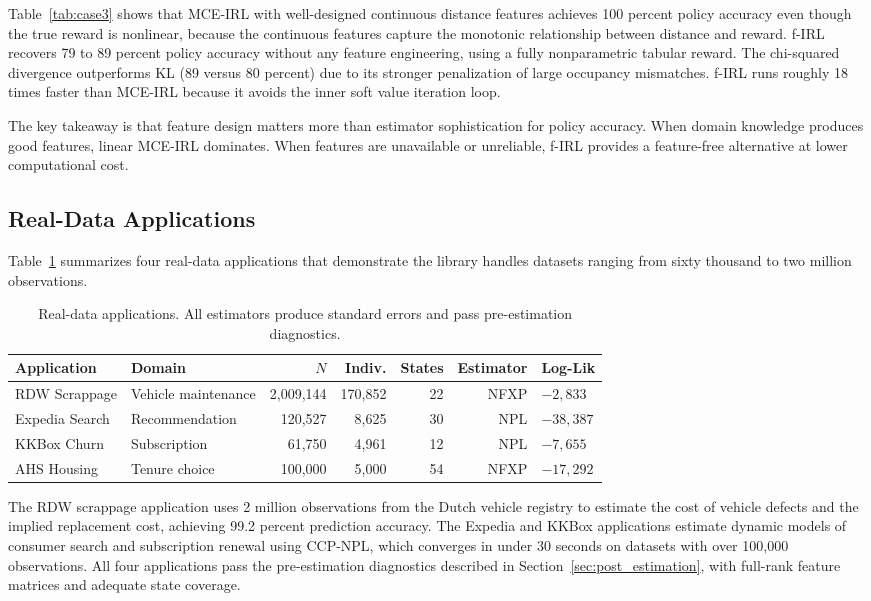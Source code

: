 Table~\ref{tab:case3} shows that MCE-IRL with well-designed continuous distance features achieves 100 percent policy accuracy even though the true reward is nonlinear, because the continuous features capture the monotonic relationship between distance and reward.
f-IRL recovers 79 to 89 percent policy accuracy without any feature engineering, using a fully nonparametric tabular reward.
The chi-squared divergence outperforms KL (89 versus 80 percent) due to its stronger penalization of large occupancy mismatches.
f-IRL runs roughly 18 times faster than MCE-IRL because it avoids the inner soft value iteration loop.

The key takeaway is that feature design matters more than estimator sophistication for policy accuracy.
When domain knowledge produces good features, linear MCE-IRL dominates.
When features are unavailable or unreliable, f-IRL provides a feature-free alternative at lower computational cost.


\subsection{Real-Data Applications}
\label{sec:applications}

Table~\ref{tab:realdata} summarizes four real-data applications that demonstrate the library handles datasets ranging from sixty thousand to two million observations.

\begin{table}[H]
\centering
\caption{Real-data applications. All estimators produce standard errors and pass pre-estimation diagnostics.}
\label{tab:realdata}
\small
\begin{tabular}{llrrrrl}
\toprule
Application & Domain & $N$ & Indiv. & States & Estimator & Log-Lik \\
\midrule
RDW Scrappage   & Vehicle maintenance & 2{,}009{,}144 & 170{,}852 & 22 & NFXP & $-2{,}833$ \\
Expedia Search  & Recommendation     & 120{,}527    & 8{,}625   & 30 & NPL  & $-38{,}387$ \\
KKBox Churn     & Subscription       & 61{,}750     & 4{,}961   & 12 & NPL  & $-7{,}655$ \\
AHS Housing     & Tenure choice      & 100{,}000    & 5{,}000   & 54 & NFXP & $-17{,}292$ \\
\bottomrule
\end{tabular}
\end{table}

The RDW scrappage application uses 2 million observations from the Dutch vehicle registry to estimate the cost of vehicle defects and the implied replacement cost, achieving 99.2 percent prediction accuracy.
The Expedia and KKBox applications estimate dynamic models of consumer search and subscription renewal using CCP-NPL, which converges in under 30 seconds on datasets with over 100{,}000 observations.
All four applications pass the pre-estimation diagnostics described in Section~\ref{sec:post_estimation}, with full-rank feature matrices and adequate state coverage.

